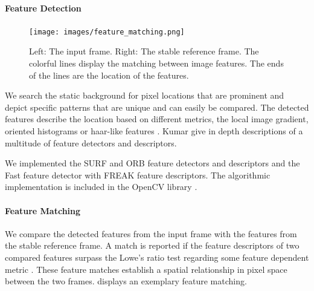 \paragraph{Feature Detection}
\begin{figure}[t]
   \begin{center}
      \texttt{[image: images/feature\_matching.png]}
   \end{center}
   \caption{
      Left: The input frame. 
      Right: The stable reference frame.
      The colorful lines display the matching between image features. 
      The ends of the lines are the location of the features.
       }
   \label{fig:dynamic_stabilization_feature_matching}
\end{figure}

We search the static background for pixel locations that are prominent and depict specific patterns that are unique and can easily be compared.
The detected features describe the location based on different metrics, \eg{} the local image gradient, oriented histograms or haar-like features \cite{stork2001pattern}.
Kumar \etal{} \cite{kumar2014survey} give in depth descriptions of a multitude of feature detectors and descriptors.

We implemented the SURF \cite{bay10.1007/11744023_32} and ORB \cite{rublee6126544} feature detectors and descriptors and the Fast \cite{Ghahremani_2021} feature detector with FREAK \cite{alahi6247715} feature descriptors. The algorithmic implementation is included in the OpenCV library \cite{opencv_library}. 


\paragraph{Feature Matching}
We compare the detected features from the input frame with the features from the stable reference frame.
A match is reported if the feature descriptors of two compared features surpass the Lowe's ratio test \cite{lowe10.1023/B:VISI.0000029664.99615.94} regarding some feature dependent metric \cite{kumar2014survey}.
These feature matches establish a spatial relationship in pixel space between the two frames.
 displays an exemplary feature matching.


